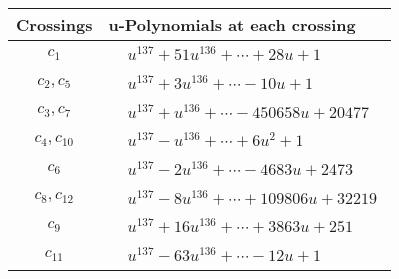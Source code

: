 \documentclass[1p]{elsarticle_modified}
\theoremstyle{definition}
\begin{document}
\begin{tabular}{m{50pt}|m{274pt}}
Crossings & \hspace{64pt}u-Polynomials at each crossing \\
\hline $$\begin{aligned}c_{1}\end{aligned}$$&$\begin{aligned}
&u^{137}+51 u^{136}+\cdots+28 u+1
\end{aligned}$\\
\hline $$\begin{aligned}c_{2},c_{5}\end{aligned}$$&$\begin{aligned}
&u^{137}+3 u^{136}+\cdots-10 u+1
\end{aligned}$\\
\hline $$\begin{aligned}c_{3},c_{7}\end{aligned}$$&$\begin{aligned}
&u^{137}+u^{136}+\cdots-450658 u+20477
\end{aligned}$\\
\hline $$\begin{aligned}c_{4},c_{10}\end{aligned}$$&$\begin{aligned}
&u^{137}- u^{136}+\cdots+6 u^2+1
\end{aligned}$\\
\hline $$\begin{aligned}c_{6}\end{aligned}$$&$\begin{aligned}
&u^{137}-2 u^{136}+\cdots-4683 u+2473
\end{aligned}$\\
\hline $$\begin{aligned}c_{8},c_{12}\end{aligned}$$&$\begin{aligned}
&u^{137}-8 u^{136}+\cdots+109806 u+32219
\end{aligned}$\\
\hline $$\begin{aligned}c_{9}\end{aligned}$$&$\begin{aligned}
&u^{137}+16 u^{136}+\cdots+3863 u+251
\end{aligned}$\\
\hline $$\begin{aligned}c_{11}\end{aligned}$$&$\begin{aligned}
&u^{137}-63 u^{136}+\cdots-12 u+1
\end{aligned}$\\
\hline
\end{tabular}\\~\\
\end{document}
